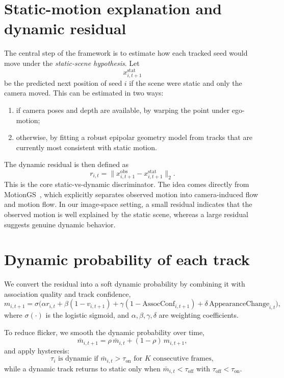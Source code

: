 \documentclass[11pt]{article}
\begin{document}
\section{Static-motion explanation and dynamic residual}
The central step of the framework is to estimate how each tracked seed would move under the \emph{static-scene hypothesis}. Let
\begin{equation}
 x^{\mathrm{stat}}_{i,t+1}
\end{equation}
be the predicted next position of seed $i$ if the scene were static and only the camera moved. This can be estimated in two ways:
\begin{enumerate}[leftmargin=1.5em]
 \item if camera poses and depth are available, by warping the point under ego-motion;
 \item otherwise, by fitting a robust epipolar geometry model from tracks that are currently most consistent with static motion.
\end{enumerate}

The dynamic residual is then defined as
\begin{equation}
 r_{i,t} = \|x^{\mathrm{obs}}_{i,t+1} - x^{\mathrm{stat}}_{i,t+1}\|_2.
\end{equation}
This is the core static-vs-dynamic discriminator. The idea comes directly from MotionGS~\cite{motiongs2024}, which explicitly separates observed motion into camera-induced flow and motion flow. In our image-space setting, a small residual indicates that the observed motion is well explained by the static scene, whereas a large residual suggests genuine dynamic behavior.

\section{Dynamic probability of each track}
We convert the residual into a soft dynamic probability by combining it with association quality and track confidence,
\begin{equation}
 m_{i,t+1}
 =
 \sigma\!\Big(
 \alpha r_{i,t}
 +\beta(1-v_{i,t+1})
 +\gamma(1-\mathrm{AssocConf}_{i,t+1})
 +\delta\,\mathrm{AppearanceChange}_{i,t}
 \Big),
\end{equation}
where $\sigma(\cdot)$ is the logistic sigmoid, and $\alpha,\beta,\gamma,\delta$ are weighting coefficients.

To reduce flicker, we smooth the dynamic probability over time,
\begin{equation}
 \bar{m}_{i,t+1} = \rho\,\bar{m}_{i,t} + (1-\rho)\,m_{i,t+1},
\end{equation}
and apply hysteresis:
\begin{equation}
 \tau_i \text{ is dynamic if } \bar{m}_{i,t} > \tau_{\mathrm{on}} \text{ for } K \text{ consecutive frames},
\end{equation}
while a dynamic track returns to static only when $\bar{m}_{i,t} < \tau_{\mathrm{off}}$ with $\tau_{\mathrm{off}} < \tau_{\mathrm{on}}$.
\end{document}

